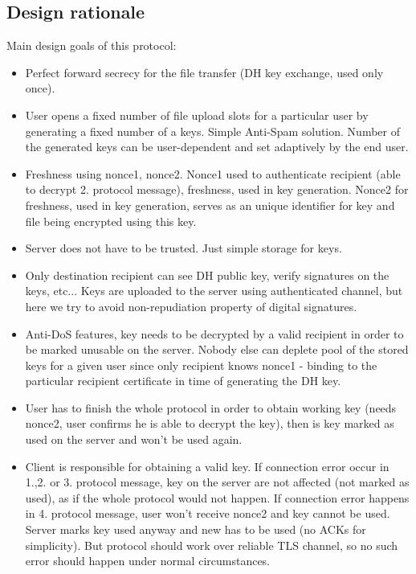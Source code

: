 \documentclass[a4paper,10pt]{article}
\begin{document}
\subsection{Design rationale}
Main design goals of this protocol:
\begin{itemize}
 \item Perfect forward secrecy for the file transfer (DH key exchange, used only once).
 \item User opens a fixed number of file upload slots for a particular user by generating a fixed number of a keys. Simple Anti-Spam solution. 
	Number of the generated keys can be user-dependent and set adaptively by the end user.
 \item Freshness using nonce1, nonce2. Nonce1 used to authenticate recipient (able to decrypt 2. protocol message), freshness, used in key generation. 
	Nonce2 for freshness, used in key generation, serves as an unique identifier for key and file being encrypted using this key.
 \item Server does not have to be trusted. Just simple storage for keys.
 \item Only destination recipient can see DH public key, verify signatures on the keys, etc... 
    Keys are uploaded to the server using authenticated channel, but here we try to avoid non-repudiation property of digital
    signatures.
 \item Anti-DoS features, key needs to be decrypted by a valid recipient in order to be marked unusable on the server. Nobody 
    else can deplete pool of the stored keys for a given user since only recipient knows nonce1 - binding to the particular recipient 
    certificate in time of generating the DH key.
 \item User has to finish the whole protocol in order to obtain working key (needs nonce2, user confirms he is able to decrypt the key), then is key marked as used on the 
    server and won't be used again. 
 \item Client is responsible for obtaining a valid key. If connection error occur in 1.,2. or 3. protocol message, key on the server
    are not affected (not marked as used), as if the whole protocol would not happen. If connection error happens in 4. protocol message,
    user won't receive nonce2 and key cannot be used. Server marks key used anyway and new has to be used (no ACKs for simplicity).
    But protocol should work over reliable TLS channel, so no such error should happen under normal circumstances.
\end{itemize}
\end{document}
